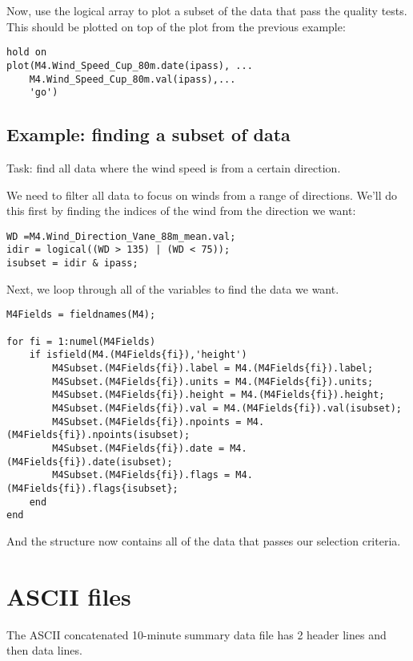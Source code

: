 Now, use the logical array to plot a subset of the data that pass the quality tests. This should be plotted on top of the plot from the  previous example: 

\begin{lstlisting}
hold on
plot(M4.Wind_Speed_Cup_80m.date(ipass), ...
    M4.Wind_Speed_Cup_80m.val(ipass),...
    'go')
\end{lstlisting}


\subsection{Example: finding a subset of data}
Task: find all data where the wind speed is from a certain direction.

We need to filter all data to focus on winds from a range of directions. We'll do this first by finding the indices of the wind from the direction we want:

\begin{lstlisting}
WD =M4.Wind_Direction_Vane_88m_mean.val;
idir = logical((WD > 135) | (WD < 75));
isubset = idir & ipass;
\end{lstlisting}

Next, we loop through all of the variables to find the data we want.

\begin{lstlisting}
M4Fields = fieldnames(M4);

for fi = 1:numel(M4Fields)
    if isfield(M4.(M4Fields{fi}),'height')
        M4Subset.(M4Fields{fi}).label = M4.(M4Fields{fi}).label;
        M4Subset.(M4Fields{fi}).units = M4.(M4Fields{fi}).units;
        M4Subset.(M4Fields{fi}).height = M4.(M4Fields{fi}).height;
        M4Subset.(M4Fields{fi}).val = M4.(M4Fields{fi}).val(isubset);
        M4Subset.(M4Fields{fi}).npoints = M4.(M4Fields{fi}).npoints(isubset);
        M4Subset.(M4Fields{fi}).date = M4.(M4Fields{fi}).date(isubset);
        M4Subset.(M4Fields{fi}).flags = M4.(M4Fields{fi}).flags{isubset};
    end
end
\end{lstlisting}

And the structure  now contains all of the data that passes our selection criteria.

\newpage
\section{ASCII files\label{s:LFASCII}}
The ASCII concatenated 10-minute summary data file has 2 header lines and then data lines. 

